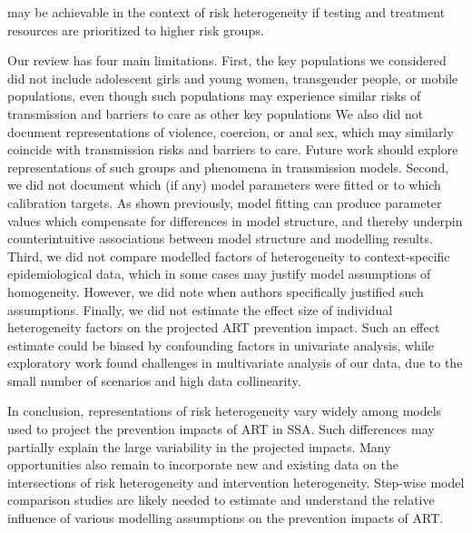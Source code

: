 may be achievable in the context of risk heterogeneity
if testing and treatment resources are prioritized to higher risk groups.
\par
Our review has four main limitations.
First, the key populations we considered did not include
adolescent girls and young women, transgender people, or mobile populations,
even though such populations may experience similar risks of transmission and barriers to care
as other key populations\cite{Tanser2015,Dellar2015}
We also did not document representations of violence, coercion, or anal sex,
which may similarly coincide with transmission risks and barriers to care.
\cite{Silverman2011,Baggaley2013}
Future work should explore representations of
such groups and phenomena in transmission models.
Second, we did not document which (if any) model parameters were fitted
or to which calibration targets.
As shown previously\cite{Eaton2014a,Knight2020}, model fitting can produce
parameter values which compensate for differences in model structure,
and thereby underpin counterintuitive associations between model structure and modelling results.
Third, we did not compare modelled factors of heterogeneity to
context-specific epidemiological data,
which in some cases may justify model assumptions of homogeneity.
However, we did note when authors specifically justified such assumptions.
Finally, we did not estimate the effect size of
individual heterogeneity factors on the projected ART prevention impact.
Such an effect estimate could be biased by confounding factors in univariate analysis,
while exploratory work found challenges in multivariate analysis of our data,
due to the small number of scenarios and high data collinearity.
\par
In conclusion, representations of risk heterogeneity vary widely
among models used to project the prevention impacts of ART in SSA.
Such differences may partially explain the large variability in the projected impacts.
Many opportunities also remain to incorporate new and existing data on
the intersections of risk heterogeneity and intervention heterogeneity.
Step-wise model comparison studies are likely needed to
estimate and understand the relative influence
of various modelling assumptions on the prevention impacts of ART.
